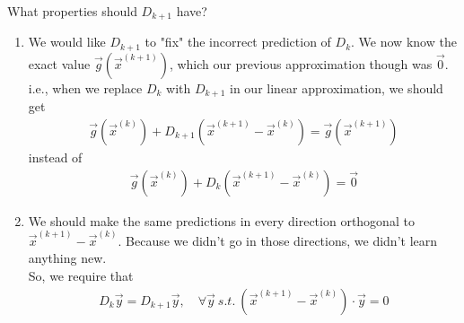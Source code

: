 \documentclass[11pt]{elegantbook}
\begin{document}
What properties should $D_{k+1}$ have?
\begin{enumerate}
    \item We would like $D_{k+1}$ to "fix" the incorrect prediction of $D_k$. We now know the exact value $\vec{g}(\vec{x}^{(k+1)})$, which our previous approximation  though was $\vec{0}$.\\
    i.e., when we replace $D_k$ with $D_{k+1}$ in our linear approximation, we should get
    \begin{equation}
        \begin{aligned}
            \vec{g}(\vec{x}^{(k)})+D_{k+1}(\vec{x}^{(k+1)}-\vec{x}^{(k)})=\vec{g}(\vec{x}^{(k+1)})
        \end{aligned}
        \tag{1}
    \end{equation}
    instead of
    \begin{equation}
        \begin{aligned}
            \vec{g}(\vec{x}^{(k)})+D_{k}(\vec{x}^{(k+1)}-\vec{x}^{(k)})=\vec{0}
        \end{aligned}
        \tag{2}
    \end{equation}
    \item We should make the same predictions in every direction orthogonal to $\vec{x}^{(k+1)}-\vec{x}^{(k)}$. Because we didn't go in those directions, we didn't learn anything new.\\
    So, we require that
    \begin{equation}
        \begin{aligned}
            D_k \vec{y}=D_{k+1} \vec{y},\quad \forall \vec{y}\ s.t.\ (\vec{x}^{(k+1)}-\vec{x}^{(k)})\cdot \vec{y}=0
        \end{aligned}
        \tag{3}
    \end{equation}
\end{enumerate}
\end{document}
